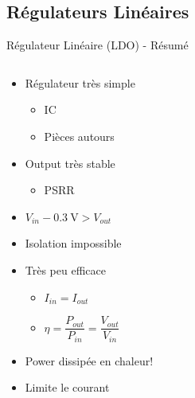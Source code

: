 \subsection{Régulateurs Linéaires}


\begin{frame}{Régulateur Linéaire (LDO) - Résumé}
    \begin{columns}
        \begin{column}{0.5\textwidth}
            \vspace{-24pt}
            \begin{itemize}
                \item<1-> Régulateur très simple
                \begin{itemize}
                    \item<1-> IC
                    \item<1-> Pièces autours
                \end{itemize}
                \item<2-> Output très stable
                \begin{itemize}
                    \item<2-> PSRR
                \end{itemize}
                \item<3-> $V_{in} - \SI{0.3}{\volt} > V_{out}$
                \item<3-> Isolation impossible
                \item<4-> Très peu efficace
                \begin{itemize}
                    \setlength{\itemsep}{4pt}
                    \item<4-> $I_{in} = I_{out}$
                    \item<4-> $\eta = \dfrac{P_{out}}{P_{in}} = \dfrac{V_{out}}{V_{in}}$
                \end{itemize}
                \item<5-> Power dissipée en chaleur!
                \item<5-> Limite le courant
            \end{itemize}
        \end{column}


\end{columns}
\end{frame}
